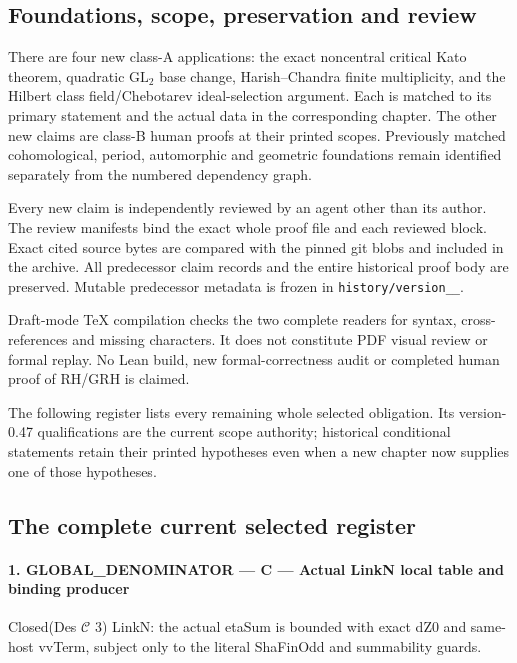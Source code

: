 \documentclass[11pt,a4paper]{article}
\numberwithin{equation}{section}
\theoremstyle{remark}\newtheorem{remark}[theorem]{Remark}
\begin{document}
\subsection{Foundations, scope, preservation and review}

There are four new class-A applications: the exact noncentral critical
Kato theorem, quadratic \(\mathrm{GL}_2\) base change,
Harish--Chandra finite multiplicity, and the Hilbert class
field/Chebotarev ideal-selection argument. Each is matched to its
primary statement and the actual data in the corresponding chapter.
The other new claims are class-B human proofs at their printed scopes.
Previously matched cohomological, period, automorphic and geometric
foundations remain identified separately from the numbered dependency
graph.

Every new claim is independently reviewed by an agent other than its
author. The review manifests bind the exact whole proof file and each
reviewed block. Exact cited source bytes are compared with the pinned
git blobs and included in the archive. All predecessor claim records
and the entire historical proof body are preserved. Mutable predecessor
metadata is frozen in \texttt{history/\allowbreak version\_\_}.

Draft-mode TeX compilation checks the two complete readers for syntax,
cross-references and missing characters. It does not constitute PDF
visual review or formal replay. No Lean build, new formal-correctness
audit or completed human proof of RH/GRH is claimed.

The following register lists every remaining whole selected obligation.
Its version-0.47 qualifications are the current scope authority;
historical conditional statements retain their printed hypotheses even
when a new chapter now supplies one of those hypotheses.

\subsection{The complete current selected register}

\paragraph{1. GLOBAL\_\allowbreak DENOMINATOR — C — Actual LinkN local table and binding producer}

Closed(Des $\mathcal C$ 3) LinkN: the actual etaSum is bounded with exact dZ0 and same-host vvTerm, subject only to the literal ShaFinOdd and summability guards.
\end{document}
